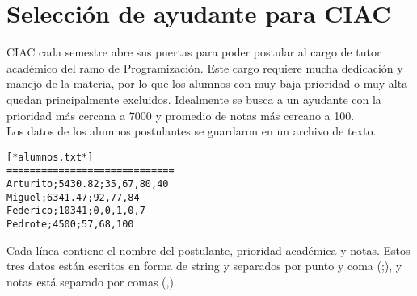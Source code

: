 \section{Selección de ayudante para CIAC}
CIAC cada semestre abre sus puertas para poder postular al cargo de tutor académico del ramo de Programización. Este cargo requiere mucha dedicación y manejo de la materia, por lo que los alumnos con muy baja prioridad o muy alta quedan principalmente excluidos. Idealmente se busca a un ayudante con la prioridad más cercana a 7000 y promedio de notas más cercano a 100.\\

Los datos de los alumnos postulantes se guardaron en un archivo de texto.\\
\begin{lstlisting}[style=consola]
[*alumnos.txt*]
=============================
Arturito;5430.82;35,67,80,40
Miguel;6341.47;92,77,84
Federico;10341;0,0,1,0,7
Pedrote;4500;57,68,100
\end{lstlisting}

Cada línea contiene el nombre del postulante, prioridad académica y notas. Estos tres datos están escritos en forma de string y separados por punto y coma (;), y notas está separado por comas (,).

